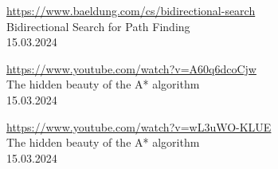 \begin{thebibliography}{999}
    \href{https://www.baeldung.com/cs/bidirectional-search}{https://www.baeldung.com/cs/bidirectional-search}\\
    Bidirectional Search for Path Finding\\
    15.03.2024

    \href{https://www.youtube.com/watch?v=A60q6dcoCjw}{https://www.youtube.com/watch?v=A60q6dcoCjw}\\
    The hidden beauty of the A* algorithm\\
    15.03.2024

    \href{https://www.youtube.com/watch?v=wL3uWO-KLUE}{https://www.youtube.com/watch?v=wL3uWO-KLUE}\\
    The hidden beauty of the A* algorithm\\
    15.03.2024
    
\end{thebibliography}